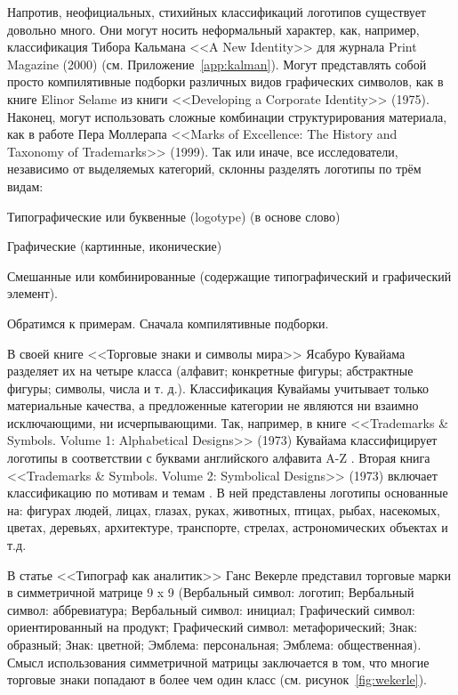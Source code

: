Напротив, неофициальных, стихийных классификаций логотипов существует довольно много. Они могут
носить неформальный характер, как, например, классификация Тибора Кальмана <<A New Identity>> для
журнала Print Magazine (2000) (см. Приложение~\ref{app:kalman}). Могут представлять собой
просто компилятивные подборки различных
видов графических символов, как в книге Elinor Selame из книги <<Developing a Corporate Identity>>
(1975). Наконец, могут использовать сложные комбинации структурирования материала, как в работе Пера
Моллерапа <<Marks of Excellence: The History and Taxonomy of Trademarks>> (1999). Так или иначе, все
исследователи, независимо от выделяемых категорий, склонны разделять логотипы по трём видам:
\begin{enumerate*}[label=\arabic*)]
\item Типографические или буквенные (logotype) (в основе слово)
\item Графические (картинные, иконические)
\item Смешанные или комбинированные (содержащие типографический и графический элемент).
\end{enumerate*}

Обратимся к примерам. Сначала компилятивные подборки.

В своей книге <<Торговые знаки и символы мира>> Ясабуро Кувайама разделяет их на четыре класса
(алфавит; конкретные фигуры; абстрактные фигуры; символы, числа и т. д.). Классификация Кувайамы
учитывает только материальные качества, а предложенные категории не являются ни взаимно
исключающими, ни исчерпывающими. Так, например, в книге <<Trademarks \& Symbols. Volume 1:
Alphabetical Designs>> (1973) Кувайама классифицирует логотипы в соответствии с буквами английского
алфавита A-Z \autocite[][5]{kuwayama1973alphabetical}.
Вторая книга <<Trademarks \& Symbols. Volume 2: Symbolical Designs>> (1973) включает
классификацию по мотивам и темам \autocite[][5]{kuwayama1973trademarks}.
В ней представлены логотипы основанные на: фигурах людей, лицах, глазах, руках, животных, птицах, рыбах, насекомых, цветах, деревьях, архитектуре, транспорте, стрелах, астрономических объектах и т.д.

В статье <<Типограф как аналитик>> Ганс Векерле\autocite{weckerle1968typographer} представил торговые марки в
симметричной матрице 9 x 9 (Вербальный символ: логотип; Вербальный символ: аббревиатура; Вербальный
символ: инициал; Графический символ: ориентированный на продукт; Графический символ: метафорический;
Знак: образный; Знак: цветной; Эмблема: персональная; Эмблема: общественная). Смысл использования
симметричной матрицы заключается в том, что многие торговые знаки попадают в более чем один
класс (см. рисунок~\ref{fig:wekerle}).

